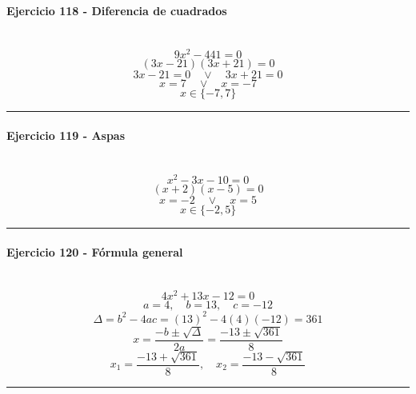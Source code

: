 \documentclass[10pt,a4paper]{article}
\newcommand{\res}[1]{\paragraph{#1}\mbox{}\\[-1.2em]}
\begin{document}
\res{Ejercicio 118 - Diferencia de cuadrados}
\[ 9 x^{2} - 441=0 \]
\[ (3x-21)(3x+21)=0 \]
\[ 3x-21=0 \quad \vee \quad 3x+21=0 \]
\[ x=7 \quad \vee \quad x=-7 \]
\[ \boxed{x\in\{-7,7\}} \]
\vspace{1mm}\hrule\vspace{2mm}
\res{Ejercicio 119 - Aspas}
\[ x^{2} - 3 x - 10=0 \]
\[ (x+2)(x-5)=0 \]
\[ x=-2 \quad \vee \quad x=5 \]
\[ \boxed{x\in\{-2,5\}} \]
\vspace{1mm}\hrule\vspace{2mm}
\res{Ejercicio 120 - Fórmula general}
\[ 4 x^{2} + 13 x - 12=0 \]
\[ a=4,\quad b=13,\quad c=-12 \]
\[ \Delta=b^2-4ac=(13)^2-4(4)(-12)=361 \]
\[ x=\frac{-b\pm\sqrt{\Delta}}{2a}=\frac{-13\pm\sqrt{361}}{8} \]
\[ \boxed{x_1=\frac{-13+\sqrt{361}}{8},\quad x_2=\frac{-13-\sqrt{361}}{8}} \]
\vspace{1mm}\hrule\vspace{2mm}
\end{document}
